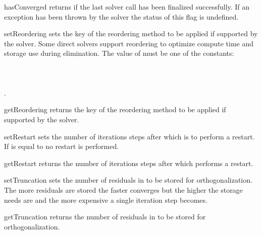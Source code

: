 \begin{methoddesc}[SolverOptions]{hasConverged}{}
returns \True if the last solver call has been finalized successfully.
If an exception has been thrown by the solver the status of this flag is undefined.
\end{methoddesc}


\begin{methoddesc}[SolverOptions]{setReordering}{}
sets the key of the reordering method to be applied if supported by the solver.
Some direct solvers support reordering to optimize compute time and storage
use during elimination. The value of  must be one of the
constants:\\
 \\
 \\
 \\
 .
\end{methoddesc}

\begin{methoddesc}[SolverOptions]{getReordering}{}
returns the key of the reordering method to be applied if supported by the solver.
\end{methoddesc}

\begin{methoddesc}[SolverOptions]{setRestart}{}
sets the number of iterations steps after which \GMRES is to perform a restart.
If  is equal to  no restart is performed.
\end{methoddesc}

\begin{methoddesc}[SolverOptions]{getRestart}{}
returns the number of iterations steps after which \GMRES performs a restart.
\end{methoddesc}

\begin{methoddesc}[SolverOptions]{setTruncation}{}
sets the number of residuals in \GMRES to be stored for orthogonalization. 
The more residuals are stored the faster \GMRES converges but the higher the storage needs are and the more expensive
a single iteration step becomes.
\end{methoddesc}

\begin{methoddesc}[SolverOptions]{getTruncation}{}
returns the number of residuals in \GMRES to be stored for orthogonalization.
\end{methoddesc}


